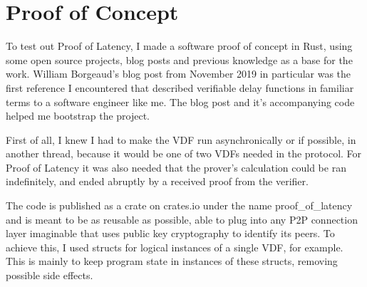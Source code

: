 \chapter{Proof of Concept}
\label{Proof of Concept}
To test out Proof of Latency, I made a software proof of concept in Rust, using some open source projects, blog posts and previous knowledge as a base for the work. William Borgeaud's blog post\cite{Borgeaud2019-wk} from November 2019 in particular was the first reference I encountered that described verifiable delay functions in familiar terms to a software engineer like me. The blog post and it's accompanying code\cite{Borgeaud2019-wk} helped me bootstrap the project.

First of all, I knew I had to make the VDF run asynchronically or if possible, in another thread, because it would be one of two VDFs needed in the protocol. For Proof of Latency it was also needed that the prover's calculation could be ran indefinitely, and ended abruptly by a received proof from the verifier.

The code is published as a crate on crates.io under the name proof\_of\_latency and is meant to be as reusable as possible, able to plug into any P2P connection layer imaginable that uses public key cryptography to identify its peers. To achieve this, I used structs for logical instances of a single VDF, for example. This is mainly to keep program state in instances of these structs, removing possible side effects.
